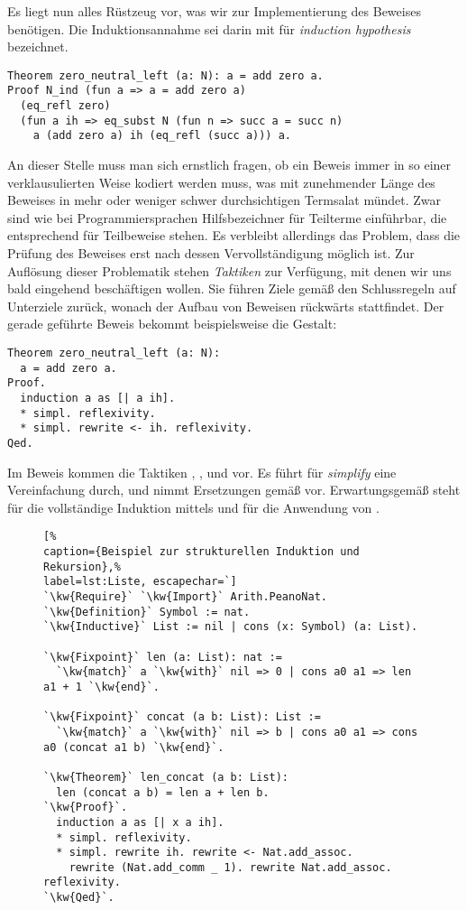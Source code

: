 \noindent
Es liegt nun alles Rüstzeug vor, was wir zur Implementierung des Beweises
benötigen. Die Induktionsannahme sei darin mit  für \emph{induction
hypothesis} bezeichnet.

\begin{lstlisting}[language=Coq, xleftmargin=\mathindent]
Theorem zero_neutral_left (a: N): a = add zero a.
Proof N_ind (fun a => a = add zero a)
  (eq_refl zero)
  (fun a ih => eq_subst N (fun n => succ a = succ n)
    a (add zero a) ih (eq_refl (succ a))) a.
\end{lstlisting}

\noindent
An dieser Stelle muss man sich ernstlich fragen, ob ein Beweis immer
in so einer verklausulierten Weise kodiert werden muss, was mit zunehmender
Länge des Beweises in mehr oder weniger schwer durchsichtigen Termsalat
mündet. Zwar sind wie bei Programmiersprachen Hilfsbezeichner für
Teilterme einführbar, die entsprechend für Teilbeweise stehen. Es verbleibt
allerdings das Problem, dass die Prüfung des Beweises erst nach dessen
Vervollständigung möglich ist. Zur Auflösung dieser Problematik stehen
\emph{Taktiken} zur Verfügung, mit denen wir uns bald eingehend
beschäftigen wollen. Sie führen Ziele gemäß den Schlussregeln auf
Unterziele zurück, wonach der Aufbau von Beweisen rückwärts stattfindet.
Der gerade geführte Beweis bekommt beispielsweise die Gestalt:
\begin{lstlisting}[language=Coq, xleftmargin=\mathindent]
Theorem zero_neutral_left (a: N):
  a = add zero a.
Proof.
  induction a as [| a ih].
  * simpl. reflexivity.
  * simpl. rewrite <- ih. reflexivity.
Qed.
\end{lstlisting}
Im Beweis kommen die Taktiken , , 
und  vor. Es führt  für \emph{simplify}
eine Vereinfachung durch, und  nimmt Ersetzungen gemäß
 vor. Erwartungsgemäß steht  für die
vollständige Induktion mittels  und  für
die Anwendung von .

\begin{figure}[t]
\begin{lstlisting}[%
caption={Beispiel zur strukturellen Induktion und Rekursion},%
label=lst:Liste, escapechar=`]
`\kw{Require}` `\kw{Import}` Arith.PeanoNat.
`\kw{Definition}` Symbol := nat.
`\kw{Inductive}` List := nil | cons (x: Symbol) (a: List).

`\kw{Fixpoint}` len (a: List): nat :=
  `\kw{match}` a `\kw{with}` nil => 0 | cons a0 a1 => len a1 + 1 `\kw{end}`.

`\kw{Fixpoint}` concat (a b: List): List :=
  `\kw{match}` a `\kw{with}` nil => b | cons a0 a1 => cons a0 (concat a1 b) `\kw{end}`.

`\kw{Theorem}` len_concat (a b: List):
  len (concat a b) = len a + len b.
`\kw{Proof}`.
  induction a as [| x a ih].
  * simpl. reflexivity.
  * simpl. rewrite ih. rewrite <- Nat.add_assoc.
    rewrite (Nat.add_comm _ 1). rewrite Nat.add_assoc. reflexivity.
`\kw{Qed}`.
\end{lstlisting}
\end{figure}

